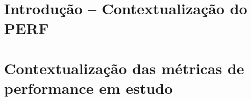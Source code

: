 \documentclass[conference,compsoc]{IEEEtran}
\begin{document}
  \maketitle







  \IEEEpeerreviewmaketitle






  \section{Introdução -- Contextualização do PERF}

  \section{Contextualização das métricas de performance em estudo}
\end{document}
